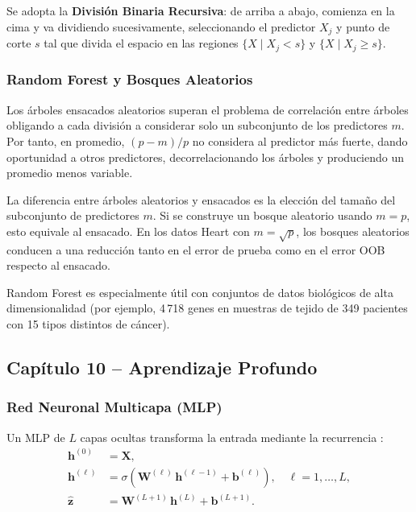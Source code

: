 \documentclass[12pt, a4paper]{article}
\newcommand{\X}{\mathbf{X}}
\newcommand{\W}{\mathbf{W}}
\newcommand{\bh}{\mathbf{h}}
\begin{document}
Se adopta la \textbf{División Binaria Recursiva}: de arriba a abajo,
comienza en la cima y va dividiendo sucesivamente, seleccionando el
predictor $X_j$ y punto de corte $s$ tal que divida el espacio en las
regiones $\{X \mid X_j < s\}$ y $\{X \mid X_j \geq s\}$.

\subsubsection{Random Forest y Bosques Aleatorios}

Los árboles ensacados aleatorios superan el problema de correlación
entre árboles obligando a cada división a considerar solo un
subconjunto de los predictores $m$. Por tanto, en promedio,
$(p-m)/p$ no considera al predictor más fuerte, dando oportunidad
a otros predictores, decorrelacionando los árboles y produciendo
un promedio menos variable.

La diferencia entre árboles aleatorios y ensacados es la elección
del tamaño del subconjunto de predictores $m$. Si se construye un
bosque aleatorio usando $m = p$, esto equivale al ensacado. En los
datos Heart con $m = \sqrt{p}$, los bosques aleatorios conducen a
una reducción tanto en el error de prueba como en el error OOB
respecto al ensacado.

Random Forest es especialmente útil con conjuntos de datos
biológicos de alta dimensionalidad (por ejemplo, 4\,718 genes en
muestras de tejido de 349 pacientes con 15 tipos distintos de cáncer).

\subsection{Capítulo 10 -- Aprendizaje Profundo}
\label{subsec:cap10}

\subsubsection{Red Neuronal Multicapa (MLP)}

Un MLP de $L$ capas ocultas transforma la entrada mediante la
recurrencia \citep[Cap.~10]{islp2023}:
\begin{align}
  \bh^{(0)} &= \X, \nonumber \\
  \bh^{(\ell)} &= \sigma\!\left(\W^{(\ell)}\,\bh^{(\ell-1)}
    + \mathbf{b}^{(\ell)}\right),
    \quad \ell = 1,\ldots,L,
  \label{eq:mlp_forward} \\
  \hat{\mathbf{z}} &= \W^{(L+1)}\,\bh^{(L)}
    + \mathbf{b}^{(L+1)}. \nonumber
\end{align}
\end{document}
